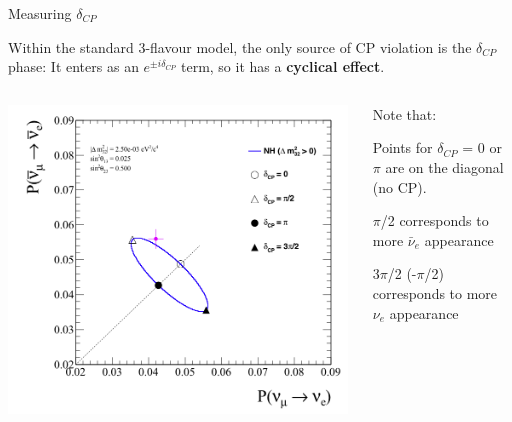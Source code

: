 %
%
\begin{frame}{Measuring $\delta_{CP}$}

{\small
       Within the standard 3-flavour model, the only source of CP
       violation is the $\delta_{CP}$ phase:
       It enters as an
       $e^{{\pm}i\delta_{CP}}$ term, so it has a {\bf cyclical effect}.
}

\begin{columns}
  \begin{column}{0.60\textwidth}
    \begin{center}
       \includegraphics[width=0.99\textwidth]{./images/biprob/biprob_expt_hiprecision_good_ellipse_vac_maximal}
    \end{center}
  \end{column}
  \begin{column}{0.40\textwidth}
  {\small
       Note that:
      \begin{itemize}
      {\scriptsize
         \item Points for $\delta_{CP}$ = 0 or $\pi$ are on the diagonal (no CP).
         \item $\pi$/2 corresponds to more $\bar{\nu}_e$ appearance
         \item 3$\pi$/2 (-$\pi$/2) corresponds to more $\nu_e$
           appearance
      }
      \end{itemize}
  }
  \end{column}
\end{columns}

\end{frame}


